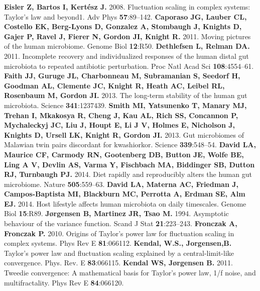 \documentclass[12pt,oneside,letterpaper]{article}
\begin{document}
\begin{thebibliography}{99}
 {\bf Eisler Z, Bartos I, Kertész J.} 2008. Fluctuation scaling in complex systems: Taylor’s law and beyond1. Adv Phys {\bf 57}:89–142.
 {\bf Caporaso JG, Lauber CL, Costello EK, Berg-Lyons D, Gonzalez A, Stombaugh J, Knights D, Gajer P, Ravel J, Fierer N, Gordon JI, Knight R.} 2011. Moving pictures of the human microbiome. Genome Biol {\bf 12}:R50.
 {\bf Dethlefsen L, Relman DA.} 2011. Incomplete recovery and individualized responses of the human distal gut microbiota to repeated antibiotic perturbation. Proc Natl Acad Sci {\bf108}:4554–61.
 {\bf Faith JJ, Guruge JL, Charbonneau M, Subramanian S, Seedorf H, Goodman AL, Clemente JC, Knight R, Heath AC, Leibel RL, Rosenbaum M, Gordon JI.} 2013. The long-term stability of the human gut microbiota. Science {\bf 341}:1237439.
 {\bf Smith MI, Yatsunenko T, Manary MJ, Trehan I, Mkakosya R, Cheng J, Kau AL, Rich SS, Concannon P, Mychaleckyj JC, Liu J, Houpt E, Li J V, Holmes E, Nicholson J, Knights D, Ursell LK, Knight R, Gordon JI.} 2013. Gut microbiomes of Malawian twin pairs discordant for kwashiorkor. Science {\bf 339}:548–54.
 {\bf David LA, Maurice CF, Carmody RN, Gootenberg DB, Button JE, Wolfe BE, Ling A V, Devlin AS, Varma Y, Fischbach MA, Biddinger SB, Dutton RJ, Turnbaugh PJ.} 2014. Diet rapidly and reproducibly alters the human gut microbiome. Nature {\bf 505}:559–63.
 {\bf David LA, Materna AC, Friedman J, Campos-Baptista MI, Blackburn MC, Perrotta A, Erdman SE, Alm EJ.} 2014. Host lifestyle affects human microbiota on daily timescales. Genome Biol {\bf 15}:R89.
 {\bf Jørgensen B, Martinez JR, Tsao M.} 1994. Asymptotic behaviour of the variance function. Scand J Stat {\bf 21}:223–243.
 {\bf Fronczak A, Fronczak P.} 2010. Origins of Taylor’s power law for fluctuation scaling in complex systems. Phys Rev E {\bf 81}:066112.
 {\bf Kendal, W.S., Jorgensen,B.} Taylor's power law and fluctuation scaling explained by a central-limit-like convergence.  Phys. Rev. E {\bf 83}:066115.
 {\bf Kendal WS, Jørgensen B.} 2011. Tweedie convergence: A mathematical basis for Taylor’s power law, 1/f noise, and multifractality. Phys Rev E {\bf 84}:066120.


\end{thebibliography}
\end{document}
